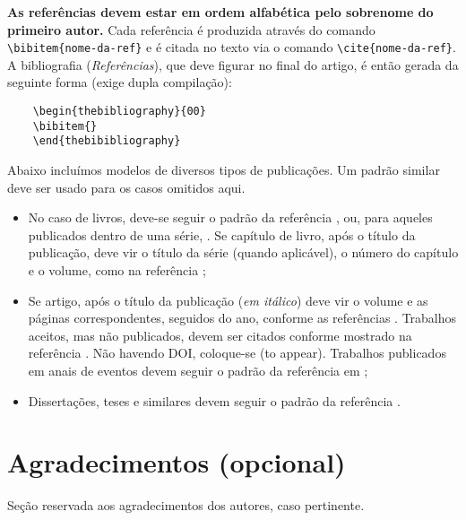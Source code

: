 \documentclass[a4,11pt]{pssbmac}
\begin{document}
	{\bf As referências devem estar em ordem alfabética pelo sobrenome do primeiro autor.} Cada referência é produzida através do comando  \verb!\bibitem{nome-da-ref}! e é citada no texto via o comando \verb!\cite{nome-da-ref}!. A bibliografia ({\it Referências}), que deve figurar no final do artigo, é então gerada da seguinte forma (exige dupla compilação):
	
	\begin{verbatim}
	\begin{thebibliography}{00}
	\bibitem{}
	\end{thebibibliography}
	\end{verbatim}
	
	Abaixo incluímos modelos de diversos tipos de publicações. Um padrão similar deve ser usado para os casos omitidos aqui.
	
	\begin{itemize}
		
		\item No caso de livros, deve-se seguir o padrão da referência \cite{Boldrini}, ou, para aqueles publicados dentro de uma série, \cite{Gomes}. Se capítulo de livro, após o título da publicação,  deve vir o título da série (quando aplicável), o número do capítulo e o volume, como na referência \cite{daSilva};
		\item Se artigo, após o título da publicação ({\it em itálico}) deve vir o volume e as páginas correspondentes, seguidos do ano, conforme as referências \cite{Diniz2}. Trabalhos aceitos, mas não publicados, devem ser citados conforme mostrado na referência \cite{Cuminato}. Não havendo DOI, coloque-se (to appear). Trabalhos publicados em anais de eventos devem seguir o padrão da referência em \cite{Santos};
		\item Dissertações, teses e similares devem seguir o padrão da referência \cite{Diniz1}.\cite{AlvesAACA_2015}
	\end{itemize}
	
	\section*{Agradecimentos (opcional)}
	Seção reservada aos agradecimentos dos autores, caso pertinente.
	
	
	
	
\end{document}
